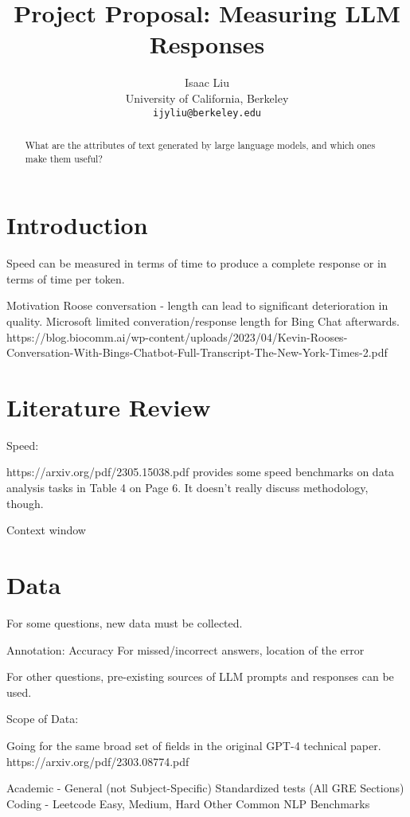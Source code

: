 \documentclass[11pt]{article}
\title{Project Proposal: Measuring LLM Responses}
\author{Isaac Liu \\
  University of California, Berkeley \\
  \texttt{ijyliu@berkeley.edu}}
\begin{document}
\maketitle
\begin{abstract}
What are the attributes of text generated by large language models, and which ones make them useful?
\end{abstract}

\section{Introduction}

Speed can be measured in terms of time to produce a complete response or in terms of time per token.

Motivation
Roose conversation - length can lead to significant deterioration in quality. Microsoft limited converation/response length for Bing Chat afterwards.
https://blog.biocomm.ai/wp-content/uploads/2023/04/Kevin-Rooses-Conversation-With-Bings-Chatbot-Full-Transcript-The-New-York-Times-2.pdf

\section{Literature Review}

Speed: 

https://arxiv.org/pdf/2305.15038.pdf provides some speed benchmarks on data analysis tasks in Table 4 on Page 6. It doesn't really discuss methodology, though.

Context window

\section{Data}

For some questions, new data must be collected.

Annotation:
Accuracy
For missed/incorrect answers, location of the error

For other questions, pre-existing sources of LLM prompts and responses can be used.

Scope of Data:

Going for the same broad set of fields in the original GPT-4 technical paper. https://arxiv.org/pdf/2303.08774.pdf

Academic - General (not Subject-Specific) Standardized tests (All GRE Sections)
Coding - Leetcode Easy, Medium, Hard
Other Common NLP Benchmarks
\end{document}
